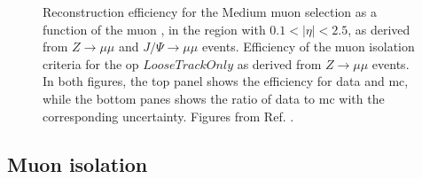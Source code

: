 \begin{figure}[h]
\begin{center}
\end{center}
 \caption{  Reconstruction efficiency for the Medium muon selection as a function of the muon \pt, in the region with $0.1<|\eta|<2.5$, as derived from $Z\rightarrow \mu \mu$ and $J/\Psi \rightarrow \mu \mu$ events. 
  Efficiency of the muon isolation criteria for the \gls{op} $LooseTrackOnly$ as derived from $Z\rightarrow \mu \mu$  events.
 In both figures, the top panel shows the efficiency for data and \gls{mc}, while the bottom panes shows the ratio of data to \gls{mc} with the corresponding uncertainty.
 Figures from Ref. \cite{Aad:2016jkr}.}
  \label{fig:obj:muon}
\end{figure}

\subsection{Muon isolation}
\label{sec:muoniso}

